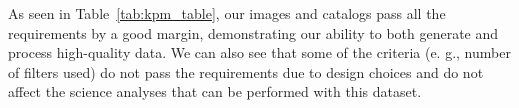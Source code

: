 \documentclass[\docopts]{\docclass}
\begin{document}
As seen in Table~\ref{tab:kpm_table}, our images and catalogs pass all the requirements by a good margin, demonstrating our ability to both generate and process high-quality data. We can also see that some of the criteria (e. g., number of filters used) do not pass the requirements due to design choices and do not affect the science analyses that can be performed with this dataset.

\end{document}

